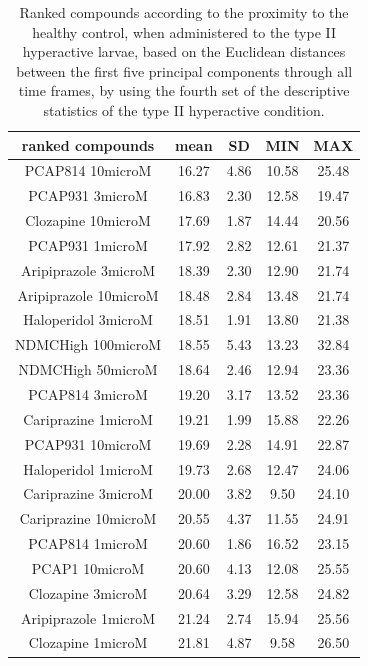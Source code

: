 \begin{table}[h!]\tiny
\centering
\caption{Ranked compounds according to the proximity to the healthy control, when administered to the type II hyperactive larvae, based on the Euclidean distances between the first five principal components through all time frames, by using the fourth set of the descriptive statistics of the type II hyperactive condition.}
\begin{tabular}{|c|c|c|c|c|}
\hline
ranked compounds             & mean & SD   & MIN  & MAX   \\ \hline
PCAP814 10microM      & 16.27 & 4.86 & 10.58 & 25.48 \\ \hline
PCAP931 3microM       & 16.83 & 2.30  & 12.58 & 19.47 \\ \hline
Clozapine 10microM    & 17.69 & 1.87 & 14.44 & 20.56 \\ \hline
PCAP931 1microM       & 17.92 & 2.82 & 12.61 & 21.37 \\ \hline
Aripiprazole 3microM  & 18.39 & 2.30  & 12.90  & 21.74 \\ \hline
Aripiprazole 10microM & 18.48 & 2.84 & 13.48 & 21.74 \\ \hline
Haloperidol 3microM   & 18.51 & 1.91 & 13.80  & 21.38 \\ \hline
NDMCHigh 100microM    & 18.55 & 5.43 & 13.23 & 32.84 \\ \hline
NDMCHigh 50microM     & 18.64 & 2.46 & 12.94 & 23.36 \\ \hline
PCAP814 3microM       & 19.20  & 3.17 & 13.52 & 23.36 \\ \hline
Cariprazine 1microM   & 19.21 & 1.99 & 15.88 & 22.26 \\ \hline
PCAP931 10microM      & 19.69 & 2.28 & 14.91 & 22.87 \\ \hline
Haloperidol 1microM   & 19.73 & 2.68 & 12.47 & 24.06 \\ \hline
Cariprazine 3microM   & 20.00    & 3.82 & 9.50   & 24.10  \\ \hline
Cariprazine 10microM  & 20.55 & 4.37 & 11.55 & 24.91 \\ \hline
PCAP814 1microM       & 20.60  & 1.86 & 16.52 & 23.15 \\ \hline
PCAP1 10microM        & 20.60  & 4.13 & 12.08 & 25.55 \\ \hline
Clozapine 3microM     & 20.64 & 3.29 & 12.58 & 24.82 \\ \hline
Aripiprazole 1microM  & 21.24 & 2.74 & 15.94 & 25.56 \\ \hline
Clozapine 1microM     & 21.81 & 4.87 & 9.58  & 26.50  \\ \hline

\end{tabular}
\end{table}
